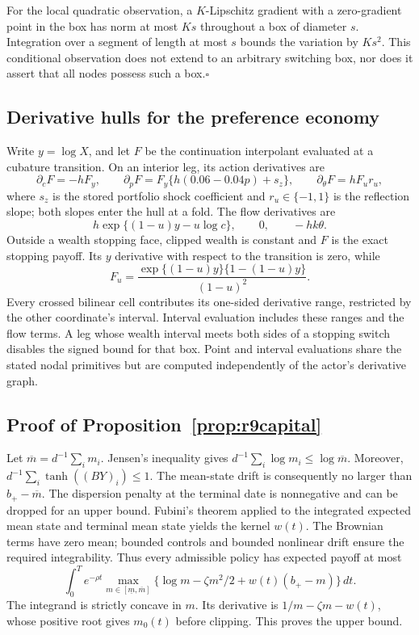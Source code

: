For the local quadratic observation, a $K$-Lipschitz gradient with a zero-gradient point in the box has norm at most $Ks$ throughout a box of diameter $s$. Integration over a segment of length at most $s$ bounds the variation by $Ks^2$. This conditional observation does not extend to an arbitrary switching box, nor does it assert that all nodes possess such a box.\hfill$\square$

\subsection{Derivative hulls for the preference economy}
Write $y=\log X$, and let $F$ be the continuation interpolant evaluated at a cubature transition. On an interior leg, its action derivatives are
\[
 \partial_c F=-hF_y,\qquad
 \partial_p F=F_y\{h(0.06-0.04p)+s_z\},\qquad
 \partial_\theta F=hF_u r_u,
\]
where $s_z$ is the stored portfolio shock coefficient and $r_u\in\{-1,1\}$ is the reflection slope; both slopes enter the hull at a fold. The flow derivatives are
\[
 h\exp\{(1-u)y-u\log c\},\qquad 0,\qquad -hk\theta.
\]
Outside a wealth stopping face, clipped wealth is constant and $F$ is the exact stopping payoff. Its $y$ derivative with respect to the transition is zero, while
\[
 F_u=\frac{\exp\{(1-u)y\}\{1-(1-u)y\}}{(1-u)^2}.
\]
Every crossed bilinear cell contributes its one-sided derivative range, restricted by the other coordinate's interval. Interval evaluation includes these ranges and the flow terms. A leg whose wealth interval meets both sides of a stopping switch disables the signed bound for that box. Point and interval evaluations share the stated nodal primitives but are computed independently of the actor's derivative graph.

\subsection{Proof of Proposition~\ref{prop:r9capital}}
Let $\overline m=d^{-1}\sum_i m_i$. Jensen's inequality gives $d^{-1}\sum_i\log m_i\leq\log\overline m$. Moreover, $d^{-1}\sum_i\tanh((BY)_i)\leq1$. The mean-state drift is consequently no larger than $b_+-\overline m$. The dispersion penalty at the terminal date is nonnegative and can be dropped for an upper bound. Fubini's theorem applied to the integrated expected mean state and terminal mean state yields the kernel $w(t)$. The Brownian terms have zero mean; bounded controls and bounded nonlinear drift ensure the required integrability. Thus every admissible policy has expected payoff at most
\[
 \int_0^T e^{-\rho t}\max_{m\in[\underline m,\overline m]}
 \{\log m-\zeta m^2/2+w(t)(b_+-m)\}\,dt.
\]
The integrand is strictly concave in $m$. Its derivative is $1/m-\zeta m-w(t)$, whose positive root gives $m_0(t)$ before clipping. This proves the upper bound.

